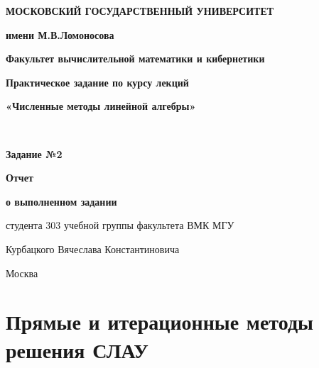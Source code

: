 \documentclass[a4paper,12pt,titlepage,final]{article}
\begin{document}
\begin{titlepage}
\centering\noindent
{
\begin{minipage}{0.1\textwidth}

\end{minipage}
\hfill
\begin{minipage}{0.77\textwidth}
\begin{center}
\textbf{МОСКОВСКИЙ ГОСУДАРСТВЕННЫЙ УНИВЕРСИТЕТ}\par
\textbf{имени М.В.Ломоносова}\par
\end{center}
\end{minipage}
\hfill
\begin{minipage}{0.1\textwidth}

\end{minipage}
}\par
{
\textbf{Факультет вычислительной математики и кибернетики}\par
\nointerlineskip
\noindent\makebox[\linewidth]{\rule{\textwidth}{0.4pt}}
}
\vfill
{
\Large{\textbf{Практическое задание по курсу лекций}}\par
\Large{\textbf{«Численные методы линейной алгебры»}}\par
}\\
{
\Large{\textbf{Задание №2}}\par
}
{
\Large{\textbf{Отчет}}\par
\Large{\textbf{о выполненном задании}}\par
\Large{студента 303 учебной группы факультета ВМК МГУ}\par
\Large{Курбацкого Вячеслава Константиновича}\par
}
\vfill
{\small Москва\\ \the\year{}}
\end{titlepage}
\tableofcontents
\newpage
\section{Прямые и итерационные методы решения СЛАУ}
\end{document}
